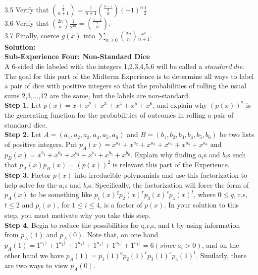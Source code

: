 \documentclass[10pt,a4paper]{report}
\begin{document}
	3.5 Verify that $\binom{\frac{1}{2}}{n+1} = \frac{1}{n+1}\binom{\frac{n-1}{2}}{n}(-1)^n\frac{1}{2}$\\
	3.6 Verify that $\binom{2n}{n}\frac{1}{2^{2n}} = \binom{\frac{n-1}{2}}{n}$.\\
	3.7 Finally, coerce $g(x)$ into $\sum_{n\geq0}^{}\binom{2n}{n}\frac{x^n}{n+1}$.\\
	\textbf{Solution: }\\
	\newline
	\textbf{Sub-Experience Four: Non-Standard Dice}\\
	A 6-sided die labeled with the integers 1,2,3,4,5,6 will be called a $standard\ die$.  The goal for this part of the Midterm Experience is to determine all ways to label a pair of dice with positive integers so that the probabilities of rolling the usual sums 2,3,...,12 are the same, but the labels are non-standard.\\
	\newline
	\textbf{Step 1.} Let $p(x) = x + x^2 + x^3 + x^4 + x^5 + x^6$, and explain why $(p(x))^2$ is the generating function for the probabilities of outcomes in rolling a pair of standard dice.\\
	\newline
	\textbf{Step 2.} Let $A = (a_1,a_2,a_3,a_4,a_5,a_6)$ and $B = (b_1,b_2,b_3,b_4,b_5,b_6)$ be two lists of positive integers.  Put $p_A(x) = x^{a_1} + x^{a_2} + x^{a_3} + x^{a_4} + x^{a_5} + x^{a_6}$ and $p_B(x) = x^{b_1} + x^{b_2} + x^{b_3} + x^{b_4} + x^{b_5} + x^{b_6}$. Explain why finding $a_i$s and $b_i$s such that $p_A(x)p_B(x) = (p(x))^2$ is relevant this part of the Experience.\\
	\newline
	\textbf{Step 3.} Factor $p(x)$ into irreducible polynomials and use this factorization to help solve for the $a_i$s and $b_i$s.  Specifically, the factorization will force the form of $p_A(x)$ to be something like $p_1(x)^qp_2(x)^rp_3(x)^sp_4(x)^t$, where $0\leq q$, r,s,$t\leq2$ and $p_i(x)$, for $ 1\leq i\leq4$, is a factor of $p(x)$.  In your solution to this step, you must motivate why you take this step.\\
	\newline
	\textbf{Step 4.} Begin to reduce the possibilities for q,r,s, and t by using information from $p_A(1)$ and $p_A(0)$.  Note that, on one hand $p_A(1) = 1^{a_1)} + 1^{a_2)} + 1^{a_3)} + 1^{a_4)} + 1^{a_5)} + 1^{a_6)} = 6(since\ a_i > 0)$, and on the other hand we have $p_A(1) = p_1(1)^qp_2(1)^rp_3(1)^sp_4(1)^t$.  Similarly, there are two ways to view $p_A(0)$.\\
\end{document}
